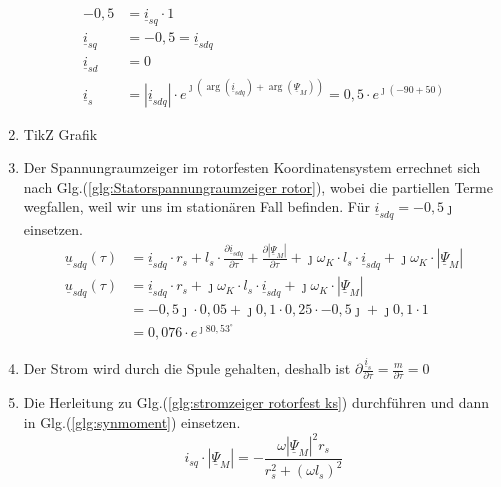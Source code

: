 \begin{solution}
\begin{enumerate}
\begin{align}
-0,5 &= \underline{i}_{sq} \cdot 1\\
\underline{i}_{sq} &= -0,5 = \underline{i}_{sdq} \\
\underline{i}_{sd} &= 0\\
\underline{i}_{s} &= |\underline{i}_{sdq}| \cdot e^{\jmath (\arg(\underline{i}_{sdq}) + \arg(\underline{\Psi}_{M}))}= 0,5 \cdot e^{\jmath ( -90 + 50)}
\end{align}
\item TikZ Grafik
\item Der Spannungraumzeiger im rotorfesten Koordinatensystem errechnet sich nach Glg.(\ref{glg:Statorspannungraumzeiger rotor}), wobei die partiellen Terme wegfallen, weil wir uns im stationären Fall befinden. Für $\underline{i}_{sdq}= -0,5 \jmath$ einsetzen.
\begin{align}
\underline{u}_{sdq}(\tau) &= \underline{i}_{sdq} \cdot r_s + l_s \cdot \frac{\partial \underline{i}_{sdq}}{\partial \tau} + \frac{\partial |\underline{\Psi}_M|}{\partial \tau} + \jmath \omega_K \cdot l_s \cdot \underline{i}_{sdq} + \jmath \omega_K \cdot |\underline{\Psi}_M|\\
\underline{u}_{sdq}(\tau) &= \underline{i}_{sdq} \cdot r_s + \jmath \omega_K \cdot l_s \cdot \underline{i}_{sdq} + \jmath \omega_K \cdot |\underline{\Psi}_M|\\
&= -0,5 \jmath \cdot 0,05 + \jmath 0,1 \cdot 0,25 \cdot -0,5 \jmath+\jmath 0,1 \cdot 1\\
&=0,076 \cdot e^{\jmath 80,53^\circ}
\end{align}
\item Der Strom wird durch die Spule gehalten, deshalb ist $\partial \frac{\underline{i}_s}{\partial \tau} = \frac{m}{\partial \tau} = 0$
\item Die Herleitung zu Glg.(\ref{glg:stromzeiger rotorfest ks}) durchführen und dann in Glg.(\ref{glg:synmoment}) einsetzen.
\begin{equation}
i_{sq} \cdot | \underline{\Psi}_M| = -\frac{\omega |\underline{\Psi}_M|^2 r_s}{r_s^2 + (\omega l_s)^2}
\end{equation}
\end{enumerate}
\end{solution}
